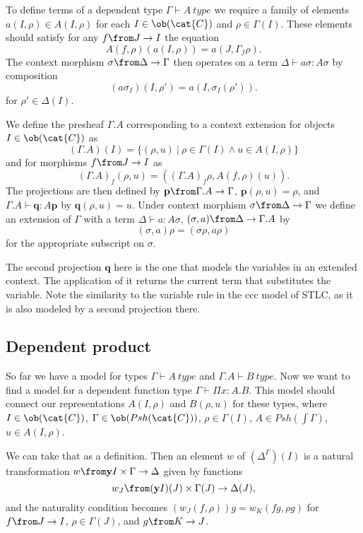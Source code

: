 To define terms of a dependent type $\Gamma \vdash A~type$ we require a family
of elements $a(I, \rho) \in A(I, \rho)$ for each $I \in \ob(\cat{C})$ and $\rho
\in \Gamma(I)$. These elements should satisfy for any $f \from J \to I$ the
equation
\[
  A(f, \rho)(a(I, \rho)) = a(J, \Gamma_f \rho).
\]
The context morphism $\sigma \from \Delta \to \Gamma$ then operates on a term
$\Delta \vdash a\sigma : A\sigma$ by composition
\[
  (a\sigma_I)(I, \rho') = a(I, \sigma_I(\rho')).
\]
for $\rho' \in \Delta(I)$.

We define the presheaf $\Gamma.A$ corresponding to a context extension for
objects $I \in \ob(\cat{C})$ as
\[
  (\Gamma.A)(I) = \{(\rho, u)~|~\rho \in \Gamma(I) \land u \in A(I, \rho)\}
\]
and for morphisms $f \from J \to I$ as
\[
  (\Gamma.A)_f(\rho, u) = ((\Gamma.A)_f \rho, A(f, \rho)(u)).
\]
The projections are then defined by $\mathbf{p} \from \Gamma.A \to \Gamma$,
$\mathbf{p}(\rho, u) = \rho$, and $\Gamma.A \vdash \mathbf{q} : A\mathbf{p}$ by
$\mathbf{q}(\rho, u) = u$. Under context morphism $\sigma \from \Delta \to
\Gamma$ we define an extension of $\Gamma$ with a term $\Delta \vdash a :
A\sigma$, $(\sigma, a) \from \Delta \to \Gamma.A$ by
\[
  (\sigma, a)\rho = (\sigma \rho, a \rho)
\]
for the appropriate subscript on $\sigma$.

The second projection $\mathbf{q}$ here is the one that models the variables in
an extended context. The application of it returns the current term that
substitutes the variable. Note the similarity to the variable rule in the ccc
model of STLC, as it is also modeled by a second projection there.

\subsection*{Dependent product}

So far we have a model for types $\Gamma \vdash A~type$ and $\Gamma.A \vdash
B~type$. Now we want to find a model for a dependent function type $\Gamma
\vdash \Pi x:A.B$. This model should connect our representations $A(I, \rho)$
and $B(\rho, u)$ for these types, where $I \in \ob(\cat{C})$, $\Gamma \in
\ob(Psh(\cat{C}))$, $\rho \in \Gamma(I)$, $A \in Psh(\int \Gamma)$, $u \in A(I,
\rho)$.

We can take that as a definition. Then an element $w$ of $(\Delta^\Gamma)(I)$
is a natural transformation $w \from \mathbf{y}I\times \Gamma \to \Delta$ given
by functions
\[
  w_J \from (\mathbf{y}I)(J) \times \Gamma(J) \to \Delta(J),
\]
and the naturality condition becomes $(w_J(f, \rho))g = w_K(fg, \rho g)$ for $f
\from J \to I$, $\rho \in \Gamma(J)$, and $g \from K \to J$.

